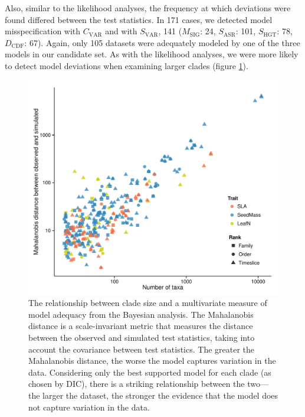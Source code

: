 Also, similar to the likelihood analyses, the frequency at which deviations were found differed between the test statistics. In 171 cases, we detected model misspecification with $C_{\text{VAR}}$ and with $S_{\text{VAR}}$, 141 ($M_{\text{SIG}}$: 24, $S_{\text{ASR}}$: 101, $S_{\text{HGT}}$: 78, $D_{\text{CDF}}$: 67). Again, only 105 datasets were adequately modeled by one of the three models in our candidate set. As with the likelihood analyses, we were more likely to detect model deviations when examining larger clades (figure \ref{fig:supp-size-adequacy}).

\begin{figure}[p]
  \centering
  \includegraphics[width=\textwidth]{figs/ad-size-bayes}
  \caption[Model adequacy vs. clade size (Bayesian)]{The relationship between clade size and a multivariate measure of model adequacy from the Bayesian analysis. The Mahalanobis distance is a scale-invariant metric that measures the distance between the observed and simulated test statistics, taking into account the covariance between test statistics. The greater the Mahalanobis distance, the worse the model captures variation in the data. Considering only the best supported model for each clade (as chosen by DIC), there is a striking relationship between the two---the larger the dataset, the stronger the evidence that the model does not capture variation in the data.}
  \label{fig:supp-size-adequacy}
\end{figure}

